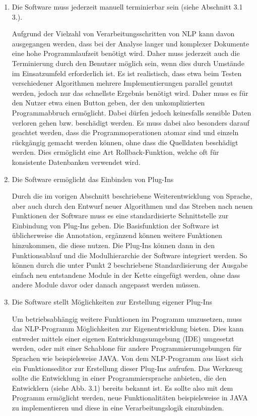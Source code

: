 \documentclass[12pt]{report}
\begin{document}
\begin{enumerate}
\item Die Software muss jederzeit manuell terminierbar sein (siehe Abschnitt 3.1 3.).

Aufgrund der Vielzahl von Verarbeitungsschritten von NLP kann davon ausgegangen werden, dass bei der Analyse langer und komplexer Dokumente eine hohe Programmlaufzeit benötigt wird. Daher muss jederzeit auch die Terminierung durch den Benutzer möglich sein, wenn dies durch Umstände im Einsatzumfeld erforderlich ist. Es ist realistisch, dass etwa beim Testen verschiedener Algorithmen mehrere Implementierungen parallel genutzt werden, jedoch nur das schnellste Ergebnis benötigt wird. 
Daher muss es für den Nutzer etwa einen Button geben, der den unkomplizierten Programmabbruch ermöglicht. Dabei dürfen jedoch keinesfalls sensible Daten verloren gehen bzw. beschädigt werden. 
Es muss dabei also besonders darauf geachtet werden, dass die Programmoperationen atomar sind und einzeln rückgängig gemacht werden können, ohne dass die Quelldaten beschädigt werden. Dies ermöglicht eine Art Rollback-Funktion, welche oft für konsistente Datenbanken verwendet wird.

\item Die Software ermöglicht das Einbinden von Plug-Ins

Durch die im vorigen Abschnitt beschriebene Weiterentwicklung von Sprache, aber auch durch den Entwurf neuer Algorithmen und das Streben nach neuen Funktionen der Software muss es eine standardisierte Schnittstelle zur Einbindung von Plug-Ins geben. Die Basisfunktion der Software ist üblicherweise die Annotation, ergänzend können weitere Funktionen hinzukommen, die diese nutzen. Die Plug-Ins können dann in den Funktionsablauf und die Modulhierarchie der Software integriert werden. So können durch die unter Punkt 2 beschriebene Standardisierung der Ausgabe einfach neu entstandene Module in der Kette eingefügt werden, ohne dass andere Module davor oder danach angepasst werden müssen.

\item Die Software stellt Möglichkeiten zur Erstellung eigener Plug-Ins

Um betriebsabhängig weitere Funktionen im Programm umzusetzen, muss das NLP-Programm Möglichkeiten zur Eigenentwicklung bieten. Dies kann entweder mittels einer eigenen Entwicklungsumgebung (IDE) umgesetzt werden, oder mit einer Schablone für andere Programmierumgebungen für Sprachen wie beispielsweise JAVA. Von dem NLP-Programm aus lässt sich ein Funktionseditor zur Erstellung dieser Plug-Ins aufrufen. Das Werkzeug sollte die Entwicklung in einer Programmiersprache anbieten, die den Entwicklern (siehe Abb. 3.1) bereits bekannt ist. Es sollte also mit dem Programm ermöglicht werden, neue Funktionalitäten beispielsweise in JAVA zu implementieren und diese in eine Verarbeitungslogik einzubinden.


\end{enumerate}
\end{document}
